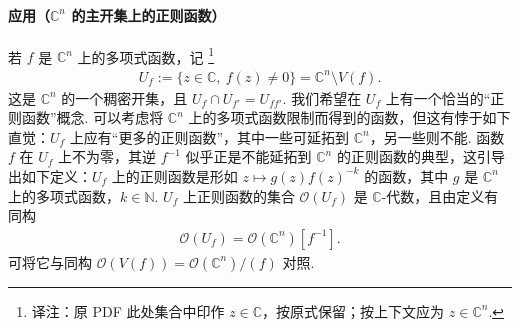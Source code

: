 \paragraph{应用（$\mathbb C^n$ 的主开集上的正则函数）}
若 $f$ 是 $\mathbb C^n$ 上的多项式函数，记
\footnote{译注：原 PDF 此处集合中印作 $z\in\mathbb C$，按原式保留；按上下文应为 $z\in\mathbb C^n$.}
\begin{align*}
U_f:=\{z\in\mathbb C,\ f(z)\ne0\}=\mathbb C^n\setminus V(f).
\end{align*}
这是 $\mathbb C^n$ 的一个稠密开集，且 $U_f\cap U_{f'}=U_{ff'}$. 我们希望在 $U_f$ 上有一个恰当的``正则函数''概念. 可以考虑将 $\mathbb C^n$ 上的多项式函数限制而得到的函数，但这有悖于如下直觉：$U_f$ 上应有``更多的正则函数''，其中一些可延拓到 $\mathbb C^n$，另一些则不能. 函数 $f$ 在 $U_f$ 上不为零，其逆 $f^{-1}$ 似乎正是不能延拓到 $\mathbb C^n$ 的正则函数的典型，这引导出如下定义：$U_f$ 上的正则函数是形如 $z\mapsto g(z)f(z)^{-k}$ 的函数，其中 $g$ 是 $\mathbb C^n$ 上的多项式函数，$k\in\mathbb N$. $U_f$ 上正则函数的集合 $\mathcal O(U_f)$ 是 $\mathbb C$-代数，且由定义有同构
\begin{align*}
\mathcal O(U_f)=\mathcal O(\mathbb C^n)[f^{-1}].
\end{align*}
可将它与同构 $\mathcal O(V(f))=\mathcal O(\mathbb C^n)/(f)$ 对照.

